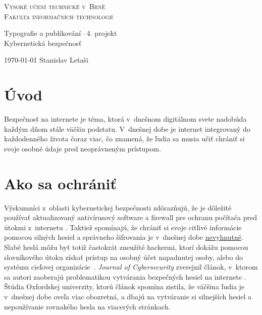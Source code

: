 \documentclass[a4paper, 11pt]{article}
\begin{document}
\begin{titlepage}
   \begin{center}
    \Huge
    
    {\textsc{Vysoké učení technické v~Brně}}\\
    {\textsc{\huge Fakulta informačních technologií}}\\
    
    \LARGE
    Typografie a publikování\,--\,4. projekt\\
    \Huge Kybernetická bezpečnosť
       

    \Large \today {} Stanislav Letaši
            
   \end{center}
\end{titlepage}

\section{Úvod}
Bezpečnosť na internete je téma, ktorá v~dnešnom digitálnom svete nadobúda každým dňom stále väčšiu podstatu. V~dnešnej dobe je internet integrovaný do každodenného života čoraz viac, čo znamená, že ľudia sa musia učiť chrániť si svoje osobné údaje pred neoprávneným prístupom. 

\section{Ako sa ochrániť}
Výskumníci z~oblasti kybernetickej bezpečnosti zdôrazňujú, že 
je dôležité používať aktualizovaný antivírusový software a 
firewall pre ochranu počítača pred útokmi z~internetu \cite{johnson2015cybersecurity}. Taktiež spomínajú, že chrániť 
si svoje citlivé informácie pomocou silných hesiel a správneho 
šifrovania je v~dnešnej dobe \underline{nevyhnutné}. 
Slabé heslá môžu byť totiž častokrát zneužité hackermi, ktorí 
dokážu pomocou slovníkového útoku získať prístup na osobný účet napadnutej osoby, alebo do systému cieľovej organizácie~\cite{hodes2015moderni}. {\it Journal of Cybersecurity} zverejnil 
článok, v~ktorom sa autori zaoberajú problematikou vytvárania 
bezpečných hesiel na internete \cite{10.1093/cybsec/tyab012}. 
Štúdia Oxfordskej univerzity, ktorú článok spomína zistila, že 
väčšina ľudia je v~dnešnej dobe oveľa viac obozretná, a dbajú 
na vytváranie si silnejších hesiel a nepoužívanie rovnakého 
hesla na viacerých stránkach. 
\end{document}
